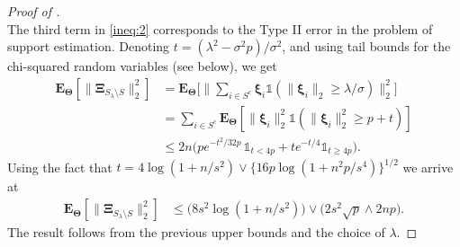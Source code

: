 \documentclass[sts,preprint,reqno,a4paper]{imsart}
\def\l{\lambda}
\def\s{\sigma}
\def\bxi{\boldsymbol\xi}
\def\bXi{\boldsymbol\Xi}
\def\bfT{\mathbf\Theta}
\def\fcar{\mathds{1}}
\def\esp{\mathbf E}
\theoremstyle{plain}
\theoremstyle{remark}
\theoremstyle{definition}
\begin{document}
\begin{proof}[Proof of ]
\begin{equation}
	\end{equation}
	The third term in \eqref{ineq:2}
	corresponds to the Type II error in the problem of support estimation. Denoting
	$t=(\lambda^2-\sigma^2p)/\sigma^2$, and using tail bounds for the chi-squared
	random variables (see  below), we get
	\begin{align}
	\esp_\bfT[\|\bXi_{S_\l \setminus S}\|_2^2]
	    &= \esp_\bfT\bigg[\bigg\| \sum_{i\in S^c} \bxi_i\fcar(\|\bxi_i\|_2\ge \l/\s)\bigg\|_2^2\bigg]\\
	    &= \sum_{i\in S^c}\esp_\bfT[\|\bxi_i\|_2^2\fcar(\|\bxi_i\|_2^2\ge p+t)]\\
	    &\le 	2n \big( pe^{-t^2/32p}\,\fcar_{t< 4p} + t
	    e^{-t/4}\fcar_{t \ge 4p}\big).
	\end{align}
	Using the fact that $t= 4\log(1+n/s^2)\vee\big\{16p\log(1+n^2p/s^4)\big\}^{1/2}$
	we arrive at
	\begin{align}
	\esp_\bfT[\|\bXi_{S_\l \setminus S}\|_2^2]
	    &\le 	\Big(8s^2\log(1+n/s^2)\Big)\vee \Big(2s^2\sqrt{p}
			\wedge 2np\Big).
	\end{align}
	The result follows from the previous upper bounds and the choice of $\l$.
\end{proof}
\end{document}
